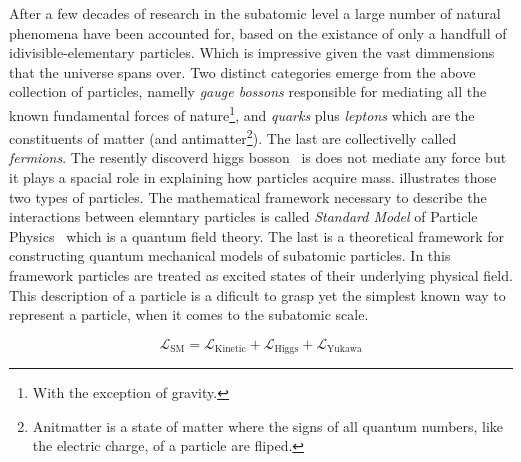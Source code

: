 After a few decades of research in the subatomic level a large number of natural phenomena have been accounted
for, based on the existance of only a handfull of idivisible-elementary particles. Which is impressive given the vast dimmensions that the
universe spans over. Two distinct categories emerge from the above collection of particles, namelly {\it gauge
bossons} responsible for mediating all the known fundamental forces of
nature\footnote{With the exception of gravity.}, and {\it quarks} plus {\it leptons} which are the
constituents of matter
(and antimatter\footnote{Anitmatter is a state of matter where the signs of all quantum numbers, like the electric charge, of a particle are fliped.}).
The last are collectivelly called {\it fermions}. The resently discoverd higgs bosson~\cite{higgs-cms,higgs-atlas} is does not mediate
any force but it plays a spacial role in explaining how particles acquire mass.  illustrates those two types of particles.
The mathematical framework necessary to describe the interactions between elemntary particles is called \textit{Standard Model} of Particle
Physics~\cite{sm-glashow,sm-weinberg,sm-salam} which is a quantum field theory. The last is a theoretical framework for constructing quantum
mechanical models of subatomic particles. In this framework particles are treated as excited states of their underlying physical field.
This description of a particle is a dificult to grasp yet the simplest known way to represent a particle, when it comes to the subatomic scale.

\begin{equation}
\mathscr{L}_{\text{SM}} =
\mathscr{L}_{\text{Kinetic}} + \mathscr{L}_{\text{Higgs}} + \mathscr{L}_{\text{Yukawa}}
\label{lagrangian}
\end{equation}


